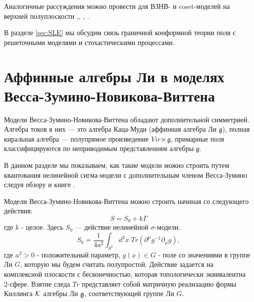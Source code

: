 Аналогичные рассуждения можно провести для ВЗНВ- и coset-моделей на верхней полуплоскости \cite{gawedzki2002boundary},\cite{ishikawa2003novel}, \cite{fuchs2005geometry,fredenhagen2002d,elitzur2002d,felder1999geometry,alekseev1999d}, \cite{mercat2001integrable}.

В разделе \ref{sec:SLE} мы обсудим связь граничной конформной теории поля с решеточными моделями и стохастическими процессами. 

\section{Аффинные алгебры Ли в моделях Весса-Зумино-Новикова-Виттена }
\label{sec:WZNW-models}

Модели Весса-Зумино-Новикова-Виттена обладают дополнительной симметрией. Алгебра токов в них --- это алгебра Каца-Муди
(аффинная алгебра Ли $\mathfrak{g}$), полная киральная алгебра --- полупрямое произведение
$Vir\ltimes \mathfrak{g}$, примарные поля классифицируются по неприводимым представлениям алгебры $\mathfrak{g}$.

В данном разделе мы показываем, как такие модели можно строить путем квантования нелинейной сигма-модели с дополнительным членом Весса-Зумино следуя обзору \cite{Walton:1999xc} и книге \cite{difrancesco1997cft}. 

Модели Весса-Зумино-Новикова-Виттена можно строить начиная со следующего действия:
\begin{equation}
\label{eq:4}
  S=S_0+k\Gamma
\end{equation}
где $k$ - целое.
Здесь $S_0$ --- действие нелинейной $\sigma$-модели.
\begin{equation}
  \label{eq:5}
  S_0=\frac{1}{4a^2}\int_{S^2} d^2x\; Tr (\partial^{\mu}g^{-1}\partial_{\mu}g),
\end{equation}
где $a^2>0$ - положительный параметр, $g(x)\in G$ - поле со значениями в группе Ли $G$, которую мы
будем считать полупростой. Действие задается на комплексной плоскости с бесконечностью, которая
топологически эквивалентна 2-сфере. Взятие следа $Tr$ представляет собой матричную реализацию формы Киллинга ${\cal K}$ алгебры Ли $\mathfrak{g}$, соответствующей группе Ли $G$.

